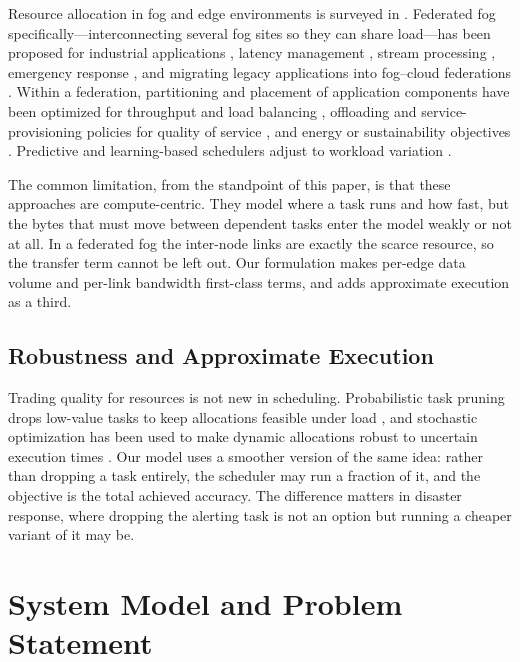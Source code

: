\documentclass[conference]{IEEEtran}
\begin{document}
Resource allocation in fog and edge environments is surveyed in \cite{xu2021task,vevergara2023survey}. Federated fog specifically---interconnecting several fog sites so they can share load---has been proposed for industrial applications \cite{fgcs2024}, latency management \cite{mattia2023fogcontrol}, stream processing \cite{baccarelli2019ecomobifog}, emergency response \cite{chiou2022emergency,gao2023lowlatency,kabanov2022}, and migrating legacy applications into fog--cloud federations \cite{calderon2018legacy}. Within a federation, partitioning and placement of application components have been optimized for throughput \cite{faticanti2020partitioning} and load balancing \cite{faticanti2020load}, offloading and service-provisioning policies for quality of service \cite{russo2024qos,dynamicServiceProvisioning2020,Nguyen2020}, and energy or sustainability objectives \cite{perin2022sustainable}. Predictive and learning-based schedulers adjust to workload variation \cite{kumar2023workload,huang2022adaptive,alhajji2022reinforcement,kang2021adaptive}.

The common limitation, from the standpoint of this paper, is that these approaches are compute-centric. They model where a task runs and how fast, but the bytes that must move between dependent tasks enter the model weakly or not at all. In a federated fog the inter-node links are exactly the scarce resource, so the transfer term cannot be left out. Our formulation makes per-edge data volume and per-link bandwidth first-class terms, and adds approximate execution as a third.

\subsection{Robustness and Approximate Execution}

Trading quality for resources is not new in scheduling. Probabilistic task pruning drops low-value tasks to keep allocations feasible under load \cite{gentry2019taskpruning}, and stochastic optimization has been used to make dynamic allocations robust to uncertain execution times \cite{Salehi2016}. Our model uses a smoother version of the same idea: rather than dropping a task entirely, the scheduler may run a fraction of it, and the objective is the total achieved accuracy. The difference matters in disaster response, where dropping the alerting task is not an option but running a cheaper variant of it may be.

\section{System Model and Problem Statement}
\label{sec:model}
\end{document}
